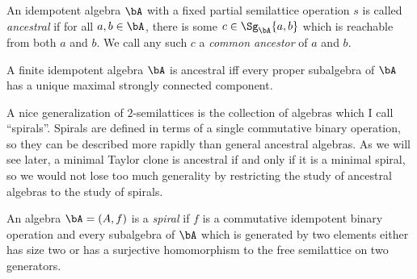 \begin{defn} An idempotent algebra $\bA$ with a fixed partial semilattice operation $s$ is called \emph{ancestral} if for all $a,b \in \bA$, there is some $c \in \Sg_{\bA}\{a,b\}$ which is reachable from both $a$ and $b$. We call any such $c$ a \emph{common ancestor} of $a$ and $b$.
\end{defn}

\begin{prop}\label{ancestral-maximal} A finite idempotent algebra $\bA$ is ancestral iff every proper subalgebra of $\bA$ has a unique maximal strongly connected component.
\end{prop}

A nice generalization of $2$-semilattices is the collection of algebras which I call ``spirals''. Spirals are defined in terms of a single commutative binary operation, so they can be described more rapidly than general ancestral algebras. As we will see later, a minimal Taylor clone is ancestral if and only if it is a minimal spiral, so we would not lose too much generality by restricting the study of ancestral algebras to the study of spirals.

\begin{defn} An algebra $\bA = (A,f)$ is a \emph{spiral} if $f$ is a commutative idempotent binary operation and every subalgebra of $\bA$ which is generated by two elements either has size two or has a surjective homomorphism to the free semilattice on two generators.
\end{defn}

